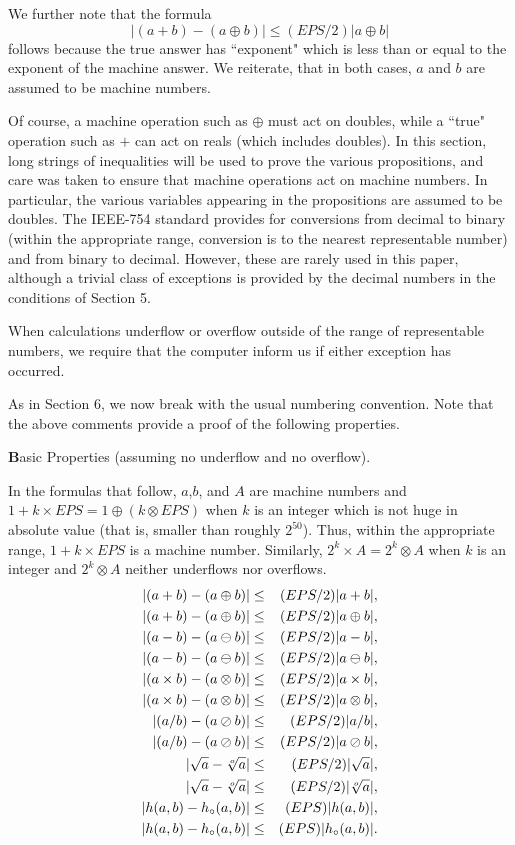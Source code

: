 We further note that the formula 
$$|(a + b) - (a \oplus b)| \leq (EPS/2) |a \oplus b|$$
follows because the true answer has ``exponent" which is less than or equal to the exponent of the machine answer.  We reiterate, that in both cases, $a$ and $b$ are assumed to be machine numbers.

Of course, a machine operation such as $\oplus$ must act on doubles, while a ``true" operation such as $+$ can act on reals (which includes doubles).
In this section, long strings of inequalities will be used to prove the various propositions, and care was taken to ensure that machine operations act on machine numbers.  In particular, the various variables appearing in the propositions are assumed to be doubles. The IEEE-754 standard provides for conversions from decimal to binary (within the appropriate range, conversion is to the nearest representable number) and from binary to decimal.  However, these are rarely used in this paper, although a trivial class of exceptions is provided by the decimal numbers in the conditions of
Section 5.

When calculations underflow or overflow outside of the range of representable numbers, we require that the computer inform us if either exception has occurred.  

As in Section 6, we now break with the usual numbering convention.  Note that the above comments provide a proof of the
following properties.

 {\textbf Basic Properties \label{GMT 7.0}(assuming no underflow and no overflow)}.

In the formulas that follow, $a$,$b$, and $A$ are machine numbers and
$1 + k \times EPS = 1 \oplus (k \otimes EPS)$ when $k$ is an integer which is not huge in absolute value (that is, 
smaller than roughly $2^{50}$).  Thus, within the appropriate range,  $1 + k \times EPS$ is a machine number.  Similarly,
$2^k
\times A = 2^k \otimes A$ when $k$ is an integer and  $2^k \otimes A$ neither underflows nor overflows.
\begin{eqnarray*}
|(a + b) - (a \oplus b)| &\leq& (EPS/2) |a + b|,\\
|(a + b) - (a \oplus b)|&\leq& (EPS/2) |a \oplus b|,\\
|(a - b) - (a \ominus b)| &\leq& (EPS/2) |a - b|,\\
|(a - b) - (a \ominus b)|&\leq& (EPS/2) |a \ominus b|,\\
|(a \times b) - (a \otimes b)| &\leq& (EPS/2) |a \times b|,\\
|(a \times b) - (a \otimes b)| &\leq&(EPS/2) |a \otimes b|,\\
|(a / b) - (a \oslash b)| &\leq& (EPS/2) |a / b|,\\
|(a / b) - (a \oslash b)| &\leq& (EPS/2) |a \oslash b|,\\
|\sqrt a - \root o \of a| &\leq& (EPS/2) |\sqrt a|,\\
|\sqrt a - \root o \of a|  &\leq&  (EPS/2) |\root o \of a|,\\
|h(a,b) - h_\circ(a,b)| &\leq& (EPS) |h(a,b)|,\\
|h(a,b) - h_\circ(a,b)| &\leq&   (EPS) |h_\circ(a,b)|.
\end{eqnarray*}

